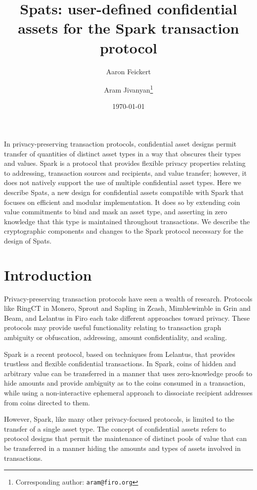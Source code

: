 \documentclass{article}
\title{Spats: user-defined confidential assets for the Spark transaction protocol}
\author[1]{Aaron Feickert}
\author[2,3]{Aram Jivanyan\thanks{Corresponding author: \texttt{aram@firo.org}}}
\affil[1]{Cypher Stack}
\affil[2]{Firo}
\affil[3]{Yerevan State University}
\date{\today}
\begin{document}
\maketitle

In privacy-preserving transaction protocols, confidential asset designs permit transfer of quantities of distinct asset types in a way that obscures their types and values.
Spark is a protocol that provides flexible privacy properties relating to addressing, transaction sources and recipients, and value transfer; however, it does not natively support the use of multiple confidential asset types.
Here we describe Spats, a new design for confidential assets compatible with Spark that focuses on efficient and modular implementation.
It does so by extending coin value commitments to bind and mask an asset type, and asserting in zero knowledge that this type is maintained throughout transactions.
We describe the cryptographic components and changes to the Spark protocol necessary for the design of Spats.


\section{Introduction}

Privacy-preserving transaction protocols have seen a wealth of research.
Protocols like RingCT \cite{ringct} in Monero, Sprout and Sapling \cite{zcash_sprout, zcash_sapling, zcash} in Zcash, Mimblewimble \cite{mw} in Grin and Beam, and Lelantus \cite{lelantus} in Firo each take different approaches toward privacy.
These protocols may provide useful functionality relating to transaction graph ambiguity or obfuscation, addressing, amount confidentiality, and scaling.

Spark \cite{spark} is a recent protocol, based on techniques from Lelantus, that provides trustless and flexible confidential transactions.
In Spark, coins of hidden and arbitrary value can be transferred in a manner that uses zero-knowledge proofs to hide amounts and provide ambiguity as to the coins consumed in a transaction, while using a non-interactive ephemeral approach to dissociate recipient addresses from coins directed to them.

However, Spark, like many other privacy-focused protocols, is limited to the transfer of a single asset type.
The concept of confidential assets refers to protocol designs that permit the maintenance of distinct pools of value that can be transferred in a manner hiding the amounts and types of assets involved in transactions.
\end{document}
